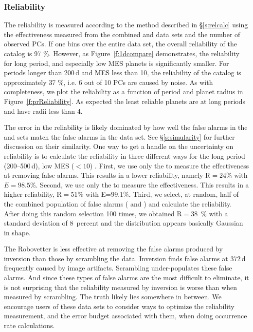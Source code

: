 \subsubsection{Reliability}
\label{s:reliability}
The reliability is measured according to the method described in \S\ref{s:relcalc} using the effectiveness measured from the combined \scrtce{} and \invtce{} data sets and the number of observed PCs.  If one bins over the entire data set, the overall reliability of the catalog is 97 \%. However, as Figure~\ref{f:1dcompare} demonstrates, the reliability for long period, and especially low MES planets is significantly smaller.  For periods longer than 200\,d and MES less than 10, the reliability of the catalog is approximately 37 \%, i.e. 6 out of 10 PCs are caused by noise. As with completeness, we plot the reliability as a function of period and planet radius in Figure~\ref{f:prReliability}. As expected the least reliable planets are at long periods and have radii less than 4\re. 

The error in the reliability is likely dominated by how well the false alarms in the \scrtce{} and \invtce{} sets match the false alarms in the \opstce{} data set. See \S\ref{s:simularity} for further discussion on their similarity.  One way to get a handle on the uncertainty on reliability is to calculate the reliability in three different ways for the long period (200--500\,d), low MES ($<10$) .  First, we use only the  to measure the effectiveness at removing false alarms. This results in a lower reliability, namely R$=24$\% with $E=98.5$\%. Second, we use only the  to measure the effectiveness. This results in a higher reliability, R$=51$\% with E=$99.1$\%. Third, we select, at random, half of the combined population of false alarms (\scrtce{} and \invtce{}) and calculate the reliability. After doing this random selection 100 times, we obtained R$=38$~\% with a standard deviation of 8~percent and the distribution appears basically Gaussian in shape.  

The Robovetter is less effective at removing the false alarms produced by inversion than those by scrambling the data. Inversion finds false alarms at 372\,d frequently caused by image artifacts.  Scrambling under-populates these false alarms. And since these types of false alarms are the most difficult to eliminate, it is not surprising that the reliability measured by inversion is worse than when measured by scrambling.  The truth likely lies somewhere in between. We encourage users of these data sets to consider ways to optimize the reliability measurement, and the error budget associated with them, when doing occurrence rate calculations. 


